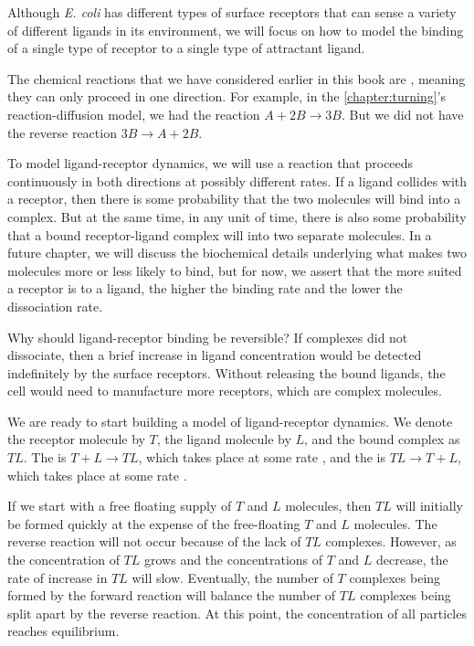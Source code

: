 Although \textit{E. coli} has different types of surface receptors that can sense a variety of different ligands in its environment, we will focus on how to model the binding of a single type of receptor to a single type of attractant ligand.

The chemical reactions that we have considered earlier in this book are , meaning they can only proceed in one direction. For example, in the \autoref{chapter:turning}'s reaction-diffusion model, we had the reaction $A + 2B \rightarrow 3B$. But we did not have the reverse reaction $3B \rightarrow A + 2B$.

To model ligand-receptor dynamics, we will use a  reaction that proceeds continuously in both directions at possibly different rates. If a ligand collides with a receptor, then there is some probability that the two molecules will bind into a complex. But at the same time, in any unit of time, there is also some probability that a bound receptor-ligand complex will  into two separate molecules. In a future chapter, we will discuss the biochemical details underlying what makes two molecules more or less likely to bind, but for now, we assert that the more suited a receptor is to a ligand, the higher the binding rate and the lower the dissociation rate.

Why should ligand-receptor binding be reversible? If complexes did not dissociate, then a brief increase in ligand concentration would be detected indefinitely by the surface receptors. Without releasing the bound ligands, the cell would need to manufacture more receptors, which are complex molecules.

We are ready to start building a model of ligand-receptor dynamics. We denote the receptor molecule by $T$, the ligand molecule by $L$, and the bound complex as $TL$. The  is $T + L \rightarrow TL$, which takes place at some rate , and the  is $TL \rightarrow T + L$, which takes place at some rate .

If we start with a free floating supply of $T$ and $L$ molecules, then $TL$ will initially be formed quickly at the expense of the free-floating $T$ and $L$ molecules. The reverse reaction will not occur because of the lack of $TL$ complexes. However, as the concentration of $TL$ grows and the concentrations of  $T$ and $L$ decrease, the rate of increase in $TL$ will slow. Eventually, the number of $T$ complexes being formed by the forward reaction will balance the number of $TL$ complexes being split apart by the reverse reaction. At this point, the concentration of all particles reaches equilibrium.


